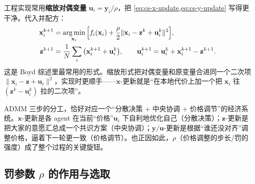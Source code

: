 工程实现常用\textbf{缩放对偶变量} $\mathbf{u}_i=\mathbf{y}_i/\rho$，把 \cref{eq:cs-x-update,eq:cs-y-update} 写得更干净。代入并配方：
\begin{align}
  \mathbf{x}_i^{k+1}&=\operatorname*{arg\,min}_{\mathbf{x}_i}\Big[f_i(\mathbf{x}_i)+\frac{\rho}{2}\|\mathbf{x}_i-\mathbf{z}^k+\mathbf{u}_i^k\|^2\Big],
  \label{eq:cs-x-scaled}\\
  \mathbf{z}^{k+1}&=\frac1N\sum_i\big(\mathbf{x}_i^{k+1}+\mathbf{u}_i^k\big),\qquad \mathbf{u}_i^{k+1}=\mathbf{u}_i^k+\mathbf{x}_i^{k+1}-\mathbf{z}^{k+1}.
  \label{eq:cs-zu-scaled}
\end{align}
这是 Boyd 综述里最常用的形式。缩放形式把对偶变量和原变量合进同一个二次项 $\|\mathbf{x}_i-\mathbf{z}+\mathbf{u}_i\|^2$，实现时更顺手——$\mathbf{x}$-更新就是“在本地代价上加一个把 $\mathbf{x}_i$ 往 $(\mathbf{z}^k-\mathbf{u}_i^k)$ 拉的二次项”。

\begin{insight}[ADMM 三步 $=$ 分散决策 + 中央协调 + 价格调节]\label{ins:cs-admm-econ}
ADMM 三步的分工，恰好对应一个“分散决策 + 中央协调 + 价格调节”的经济系统。$\mathbf{x}$-更新是各 agent 在当前“价格”$\mathbf{u}_i$ 下自利地优化自己（分散决策）；$\mathbf{z}$-更新是把大家的意愿汇总成一个共识方案（中央协调）；$\mathbf{y}/\mathbf{u}$-更新是根据“谁还没对齐”调整价格，逼着下一轮更一致（价格调节）。也正因如此，$\rho$（价格调整的步长/罚的强度）成了整个过程的关键旋钮。
\end{insight}

\subsection{罚参数 $\rho$ 的作用与选取}
\label{sec:cs-rho}


